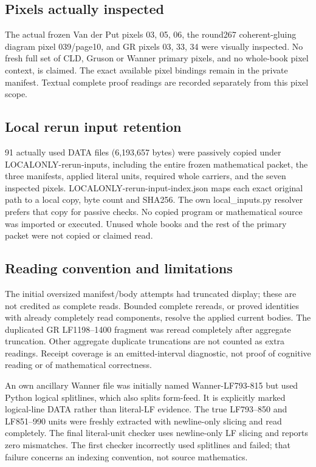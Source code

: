 \documentclass[11pt]{article}
\begin{document}
\subsection*{Pixels actually inspected}

The actual frozen Van der Put pixels 03, 05, 06, the round267 coherent-gluing diagram pixel 039/page10, and GR pixels 03, 33, 34 were visually inspected. No fresh full set of CLD, Gruson or Wanner primary pixels, and no whole-book pixel context, is claimed. The exact available pixel bindings remain in the private manifest. Textual complete proof readings are recorded separately from this pixel scope.

\subsection*{Local rerun input retention}

91 actually used DATA files (6,193,657 bytes) were passively copied under LOCALONLY-rerun-inputs, including the entire frozen mathematical packet, the three manifests, applied literal units, required whole carriers, and the seven inspected pixels. LOCALONLY-rerun-input-index.json maps each exact original path to a local copy, byte count and SHA256. The own local\_inputs.py resolver prefers that copy for passive checks. No copied program or mathematical source was imported or executed. Unused whole books and the rest of the primary packet were not copied or claimed read.

\subsection*{Reading convention and limitations}

The initial oversized manifest/body attempts had truncated display; these are not credited as complete reads. Bounded complete rereads, or proved identities with already completely read components, resolve the applied current bodies. The duplicated GR LF1198--1400 fragment was reread completely after aggregate truncation. Other aggregate duplicate truncations are not counted as extra readings. Receipt coverage is an emitted-interval diagnostic, not proof of cognitive reading or of mathematical correctness.

An own ancillary Wanner file was initially named Wanner-LF793-815 but used Python logical splitlines, which also splits form-feed. It is explicitly marked logical-line DATA rather than literal-LF evidence. The true LF793--850 and LF851--990 units were freshly extracted with newline-only slicing and read completely. The final literal-unit checker uses newline-only LF slicing and reports zero mismatches. The first checker incorrectly used splitlines and failed; that failure concerns an indexing convention, not source mathematics.
\end{document}

